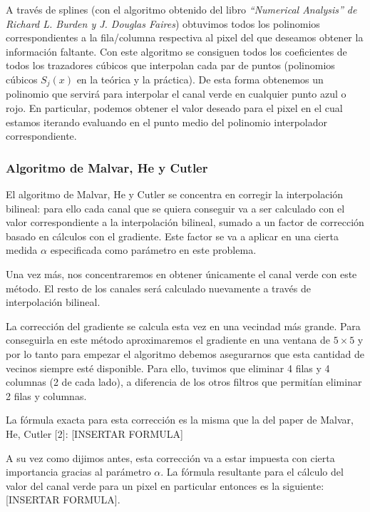 A través de splines (con el algoritmo obtenido del libro \textit{``Numerical Analysis'' de Richard L. Burden y J. Douglas Faires}) obtuvimos todos los polinomios correspondientes a la fila/columna respectiva al pixel del que deseamos obtener la información faltante. Con este algoritmo se consiguen todos los coeficientes de todos los trazadores cúbicos que interpolan cada par de puntos (polinomios cúbicos $S_j(x)$ en la teórica y la práctica). De esta forma obtenemos un polinomio que servirá para interpolar el canal verde en cualquier punto azul o rojo. En particular, podemos obtener el valor deseado para el pixel en el cual estamos iterando evaluando en el punto medio del polinomio interpolador correspondiente.

\subsubsection{Algoritmo de Malvar, He y Cutler}

El algoritmo de Malvar, He y Cutler se concentra en corregir la interpolación bilineal: para ello cada canal que se quiera conseguir va a ser calculado con el valor correspondiente a la interpolación bilineal, sumado a un factor de corrección basado en cálculos con el gradiente. Este factor se va a aplicar en una cierta medida $\alpha$ especificada como parámetro en este problema.

Una vez más, nos concentraremos en obtener únicamente el canal verde con este método. El resto de los canales será calculado nuevamente a través de  interpolación bilineal.

La corrección del gradiente se calcula esta vez en una vecindad más grande. Para conseguirla en este método aproximaremos el gradiente en una ventana de $5 \times 5$  y por lo tanto para empezar el algoritmo debemos asegurarnos que esta cantidad de vecinos siempre esté disponible. Para ello, tuvimos que eliminar 4 filas y 4 columnas (2 de cada lado), a diferencia de los otros filtros que permitían eliminar 2 filas y columnas.

La fórmula exacta para esta corrección es la misma que la del paper de Malvar, He, Cutler [2]: [INSERTAR FORMULA]

A su vez como dijimos antes, esta corrección va a estar impuesta con cierta importancia gracias al parámetro $\alpha$. La fórmula resultante para el cálculo del valor del canal verde para un pixel en particular entonces es la siguiente: [INSERTAR FORMULA].





